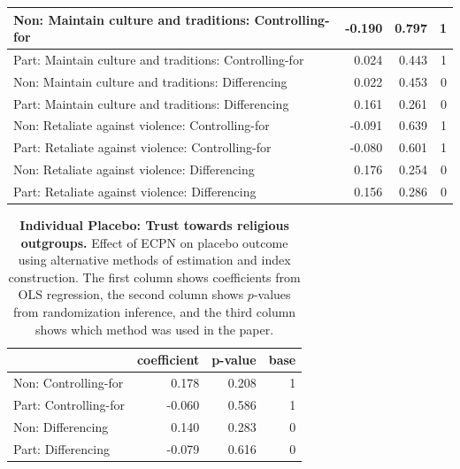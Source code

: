 \documentclass[
]{article}
\begin{document}
\begin{table}[H]
\begin{center}
\begin{tabular}{l|r|r|r}
\hline
Non: Maintain culture and traditions: Controlling-for & -0.190 & 0.797 & 1\\
\hline
Part: Maintain culture and traditions: Controlling-for & 0.024 & 0.443 & 1\\
\hline
Non: Maintain culture and traditions: Differencing & 0.022 & 0.453 & 0\\
\hline
Part: Maintain culture and traditions: Differencing & 0.161 & 0.261 & 0\\
\hline
Non: Retaliate against violence: Controlling-for & -0.091 & 0.639 & 1\\
\hline
Part: Retaliate against violence: Controlling-for & -0.080 & 0.601 & 1\\
\hline
Non: Retaliate against violence: Differencing & 0.176 & 0.254 & 0\\
\hline
Part: Retaliate against violence: Differencing & 0.156 & 0.286 & 0\\
\hline
\end{tabular}


\end{center}
\end{table}

\begin{table}[H]
\begin{center}
\label{tab:pl_out_ind}
\caption{\textbf{Individual Placebo: Trust towards religious outgroups.} Effect of ECPN on placebo outcome using alternative methods of estimation and index construction. The first column shows coefficients from OLS regression, the second column shows $p$-values from randomization inference, and the third column shows which method was used in the paper.}
\smallskip

\begin{tabular}{l|r|r|r}
\hline
  & coefficient & p-value & base\\
\hline
Non: Controlling-for & 0.178 & 0.208 & 1\\
\hline
Part: Controlling-for & -0.060 & 0.586 & 1\\
\hline
Non: Differencing & 0.140 & 0.283 & 0\\
\hline
Part: Differencing & -0.079 & 0.616 & 0\\
\hline
\end{tabular}


\end{center}
\end{table}
\end{document}
